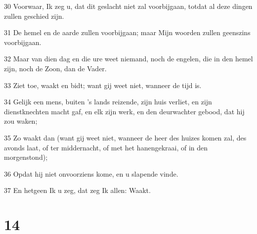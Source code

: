 \par 30 Voorwaar, Ik zeg u, dat dit geslacht niet zal voorbijgaan, totdat al deze dingen zullen geschied zijn.
\par 31 De hemel en de aarde zullen voorbijgaan; maar Mijn woorden zullen geenszins voorbijgaan.
\par 32 Maar van dien dag en die ure weet niemand, noch de engelen, die in den hemel zijn, noch de Zoon, dan de Vader.
\par 33 Ziet toe, waakt en bidt; want gij weet niet, wanneer de tijd is.
\par 34 Gelijk een mens, buiten 's lands reizende, zijn huis verliet, en zijn dienstknechten macht gaf, en elk zijn werk, en den deurwachter gebood, dat hij zou waken;
\par 35 Zo waakt dan (want gij weet niet, wanneer de heer des huizes komen zal, des avonds laat, of ter middernacht, of met het hanengekraai, of in den morgenstond);
\par 36 Opdat hij niet onvoorziens kome, en u slapende vinde.
\par 37 En hetgeen Ik u zeg, dat zeg Ik allen: Waakt.

\chapter{14}

